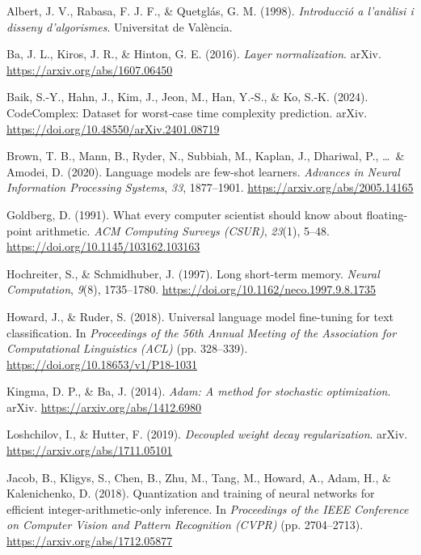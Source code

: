 \documentclass[12pt,twoside]{article}
\begin{document}
\begin{thebibliography}{100}




 Albert, J. V., Rabasa, F. J. F., \& Quetglás, G. M. (1998). \textit{Introducció a l’anàlisi i disseny d’algorismes}. Universitat de València.

 Ba, J. L., Kiros, J. R., \& Hinton, G. E. (2016). \textit{Layer normalization}. arXiv. \url{https://arxiv.org/abs/1607.06450}

 Baik, S.-Y., Hahn, J., Kim, J., Jeon, M., Han, Y.-S., \& Ko, S.-K. (2024). CodeComplex: Dataset for worst‑case time complexity prediction. arXiv. \url{https://doi.org/10.48550/arXiv.2401.08719}

 Brown, T. B., Mann, B., Ryder, N., Subbiah, M., Kaplan, J., Dhariwal, P., \ldots\ \& Amodei, D. (2020). Language models are few-shot learners. \textit{Advances in Neural Information Processing Systems}, \textit{33}, 1877--1901. \url{https://arxiv.org/abs/2005.14165}

 Goldberg, D. (1991). What every computer scientist should know about floating-point arithmetic. \textit{ACM Computing Surveys (CSUR)}, \textit{23}(1), 5--48. \url{https://doi.org/10.1145/103162.103163}

 Hochreiter, S., \& Schmidhuber, J. (1997). Long short-term memory. \textit{Neural Computation}, \textit{9}(8), 1735--1780. \url{https://doi.org/10.1162/neco.1997.9.8.1735}

 Howard, J., \& Ruder, S. (2018). Universal language model fine-tuning for text classification. In \textit{Proceedings of the 56th Annual Meeting of the Association for Computational Linguistics (ACL)} (pp. 328--339). \url{https://doi.org/10.18653/v1/P18-1031}

 Kingma, D. P., \& Ba, J. (2014). \textit{Adam: A method for stochastic optimization}. arXiv. \url{https://arxiv.org/abs/1412.6980}

 Loshchilov, I., \& Hutter, F. (2019). \textit{Decoupled weight decay regularization}. arXiv. \url{https://arxiv.org/abs/1711.05101}

 Jacob, B., Kligys, S., Chen, B., Zhu, M., Tang, M., Howard, A., Adam, H., \& Kalenichenko, D. (2018). Quantization and training of neural networks for efficient integer-arithmetic-only inference. In \textit{Proceedings of the IEEE Conference on Computer Vision and Pattern Recognition (CVPR)} (pp. 2704--2713). \url{https://arxiv.org/abs/1712.05877}


\end{thebibliography}
\end{document}
